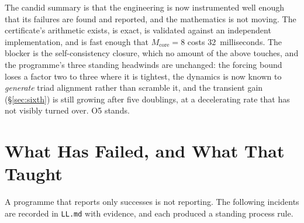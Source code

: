 \documentclass[11pt,a4paper]{article}
\theoremstyle{definition}
\theoremstyle{plain}
\begin{document}
The candid summary is that the engineering is now instrumented well enough that its failures
are found and reported, and the mathematics is not moving. The certificate's arithmetic exists, is exact, is validated against an independent
implementation, and is fast enough that $M_{\mathrm{core}}=8$ costs $32$~milliseconds. The
blocker is the self-consistency closure, which no amount of the above touches, and the
programme's three standing headwinds are unchanged: the forcing bound loses a factor two to
three where it is tightest, the dynamics is now known to \emph{generate} triad alignment rather
than scramble it, and the transient gain (\S\ref{sec:sixth}) is still growing after five
doublings, at a decelerating rate that has not visibly turned over.
O5 stands.

\section{What Has Failed, and What That Taught}
\label{sec:failures}

A programme that reports only successes is not reporting. The following incidents are recorded
in \texttt{LL.md} with evidence, and each produced a standing process rule.
\end{document}
